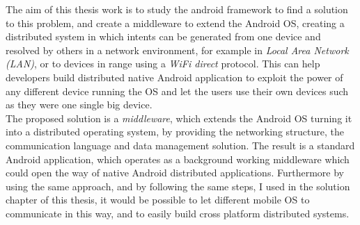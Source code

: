 The aim of this thesis work is to study the android framework to find a solution to this problem, and create a middleware to extend the Android OS, creating a distributed system in which intents can be generated from one device and resolved by others in a network environment, for example in \textit{Local Area Network (LAN)}, or to devices in range using a \textit{WiFi direct} protocol. This can help developers build distributed native Android application to exploit the power of any different device running the OS and let the users use their own devices such as they were one single big device.\\
The proposed solution is a \textit{middleware}, which extends the Android OS turning it into a distributed operating system, by providing the networking structure, the communication language and data management solution. The result is a standard Android application, which operates as a background working middleware which could open the way of native Android distributed applications. Furthermore by using the same approach, and by following the same steps, I used in the solution chapter of this thesis, it would be possible to let different mobile OS to communicate in this way, and to easily build cross platform distributed systems.

%
%
